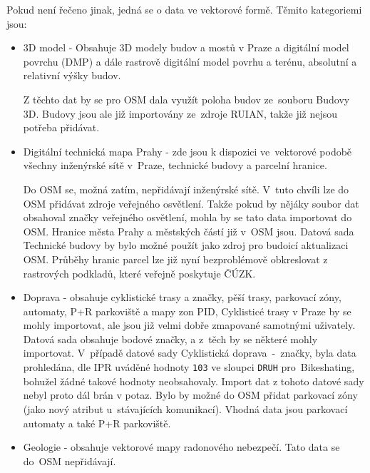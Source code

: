 Pokud není řečeno jinak, jedná se o data ve vektorové formě.
Těmito kategoriemi jsou:

\begin{itemize}
    \item   3D model - Obsahuje 3D modely budov a mostů v Praze a
            digitální model povrchu (DMP) a dále rastrově digitální
            model povrhu a terénu, absolutní a relativní výšky budov.

            Z těchto dat by se pro OSM dala využít poloha budov
            ze~souboru Budovy 3D. Budovy jsou ale již importovány
            ze~zdroje RUIAN, takže již nejsou potřeba přidávat.

    \item   Digitální technická mapa Prahy - zde jsou k dispozici
            ve~vektorové podobě všechny inženýrské sítě v~Praze,
            technické budovy a parcelní hranice.

            Do OSM se, možná zatím, nepřidávají inženýrské sítě.
            V~tuto chvíli lze do OSM přidávat zdroje veřejného
            osvětlení. Takže pokud by nějáky soubor dat obsahoval
            značky veřejného osvětlení, mohla by se tato
            data importovat do OSM. Hranice města Prahy a městských
            částí již v~OSM jsou. Datová sada Technické budovy by bylo
            možné použít jako zdroj pro budoicí aktualizaci OSM.
            Průběhy hranic parcel lze již nyní bezproblémově
            obkreslovat z rastrových podkladů, které veřejně
            poskytuje ČÚZK. 

    \item   Doprava - obsahuje cyklistické trasy a značky, pěší trasy,
            parkovací zóny, automaty, P+R parkoviště a mapy zon PID,
            Cyklisticé trasy v Praze by se mohly importovat, ale jsou
            již velmi dobře zmapované samotnými uživately. Datová sada
            obsahuje bodové značky, a z~těch by se některé mohly
            importovat. V~případě datové sady 
            Cyklistická doprava~-~značky, byla data prohledána, dle IPR
            uváděné hodnoty {\tt 103} ve sloupci {\tt DRUH}
            pro~Bikeshating, bohužel žádné takové hodnoty
            neobsahovaly. Import dat z tohoto datové sady nebyl proto
            dál brán v potaz. Bylo by možné do OSM přidat parkovací
            zóny (jako nový atribut u~stávajících komunikací).
            Vhodná data jsou parkovací automaty a také P+R parkoviště.

    \item   Geologie - obsahuje vektorové mapy radonového nebezpečí.
            Tato data se do~OSM nepřidávají.


\end{itemize}

